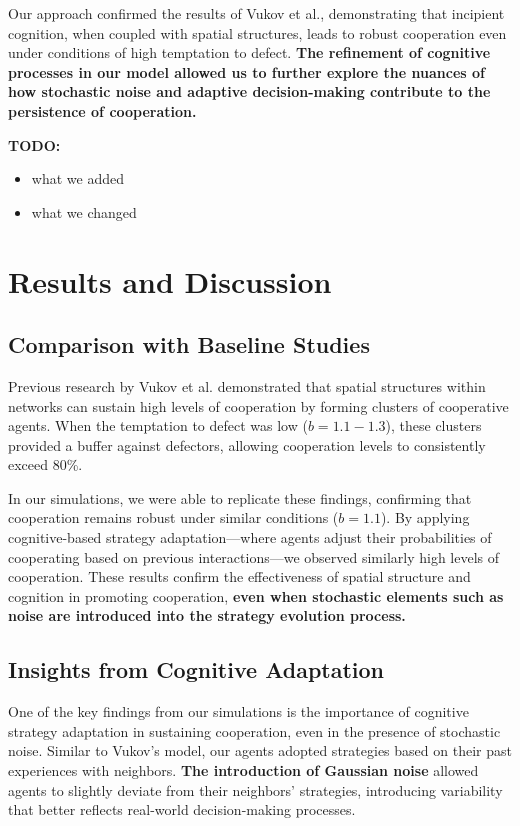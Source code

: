 \documentclass[runningheads]{llncs}
\begin{document}
Our approach confirmed the results of Vukov et al., demonstrating that incipient cognition, when coupled with spatial structures, leads to robust cooperation even under conditions of high temptation to defect. \textbf{The refinement of cognitive processes in our model allowed us to further explore the nuances of how stochastic noise and adaptive decision-making contribute to the persistence of cooperation.}

\textbf{TODO:}
\begin{itemize}
    \item what we added
    \item what we changed
\end{itemize}





\section{Results and Discussion}

\subsection{Comparison with Baseline Studies}
Previous research by Vukov et al. demonstrated that spatial structures within networks can sustain high levels of cooperation by forming clusters of cooperative agents. When the temptation to defect was low (\( b = 1.1 - 1.3 \)), these clusters provided a buffer against defectors, allowing cooperation levels to consistently exceed 80\%.

In our simulations, we were able to replicate these findings, confirming that cooperation remains robust under similar conditions (\( b = 1.1 \)). By applying cognitive-based strategy adaptation—where agents adjust their probabilities of cooperating based on previous interactions—we observed similarly high levels of cooperation. These results confirm the effectiveness of spatial structure and cognition in promoting cooperation, \textbf{even when stochastic elements such as noise are introduced into the strategy evolution process.}

\subsection{Insights from Cognitive Adaptation}
One of the key findings from our simulations is the importance of cognitive strategy adaptation in sustaining cooperation, even in the presence of stochastic noise. Similar to Vukov's model, our agents adopted strategies based on their past experiences with neighbors. \textbf{The introduction of Gaussian noise} allowed agents to slightly deviate from their neighbors' strategies, introducing variability that better reflects real-world decision-making processes.
\end{document}
